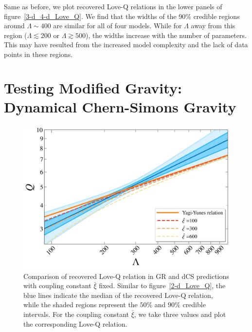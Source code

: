 \documentclass[a4paper,11pt]{article}
\begin{document}
Same as before, we plot recovered Love-Q relations in the lower panels of 
figure~\ref{3-d_4-d_Love_Q}. We find that the widths of the 90\% credible
regions around $\Lambda \sim 400$ are similar for all of four models. While for
$\Lambda$ away from this region ($\Lambda \lesssim 200$ or $\Lambda \gtrsim
500$), the widths increase with the number of parameters. This may have resulted
from the increased model complexity and the lack of data points in these
regions. 

\section{Testing Modified Gravity: Dynamical Chern-Simons Gravity}
\label{sec:dCS}

\begin{figure}[t]
    \centering
    \begin{minipage}{0.6\linewidth}
        \includegraphics[width=\linewidth]{fig_CS_xi_bar_APR4_2d.pdf}
    \end{minipage}
    \caption{Comparison of recovered Love-Q relation in GR
    and dCS predictions 
    with coupling constant $\bar{\xi}$ fixed. Similar to figure~\ref{2-d_Love_Q}, the
    blue lines indicate the median of the recovered Love-Q relation, while the
    shaded regions represent the $50\%$ and $90\%$ credible intervals. For the coupling constant 
    $\bar\xi$, we take three values
    and plot the corresponding Love-Q relation.}
    \label{cs_Love_Q}
\end{figure}
\end{document}
